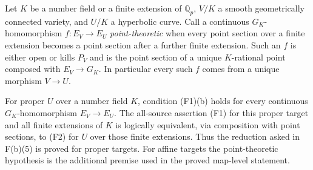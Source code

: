 \begin{proposition}
\label{F-point-theoretic}
Let $K$ be a number field or a finite extension of $\mathbb Q_p$,
$V/K$ a smooth geometrically connected variety, and $U/K$ a
hyperbolic curve. Call a continuous
$G_K$-homomorphism $f:E_V\to E_U$ \emph{point-theoretic}
when every point section over a finite extension becomes a point
section after a further finite extension. Such an $f$ is either
open or kills $P_V$ and is the point section of a unique
$K$-rational point composed with $E_V\to G_K$. In particular
every such $f$ comes from a unique morphism $V\to U$.

For proper $U$ over a number field $K$, condition (F1)(b) holds
for every continuous $G_K$-homomorphism $E_V\to E_U$. The all-source assertion
(F1) for this proper target and all finite extensions of $K$
is logically equivalent, via composition with point sections,
to (F2) for $U$ over those finite extensions. Thus the reduction
asked in F(b)(5) is proved for proper targets. For affine
targets the point-theoretic hypothesis is the additional
premise used in the proved map-level statement.
\end{proposition}
